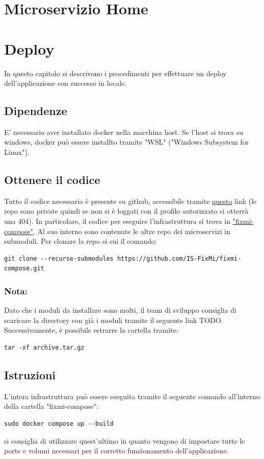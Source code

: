 \documentclass{report}
\begin{document}
\chapter{Microservizio Home}

\chapter{Deploy}

In questo capitolo si descrivono i procedimenti per effettuare un deploy dell'applicazione con successo in locale.

\section{Dipendenze}
E' necessario aver installato docker nella macchina host. Se l'host si trova su windows, docker può essere installto tramite "WSL" ("Windows Subsystem for Linux").


\section{Ottenere il codice}
Tutto il codice necessario è presente su github, accessibile tramite \href{https://github.com/orgs/IS-FixMi/repositories}{questo} link (le repo sono private quindi se non si è loggati con il profilo autorizzato si otterrà una 404). In particolare, il codice per eseguire l'infrastruttura si trova in \href{https://github.com/IS-FixMi/fixmi-compose}{"fixmi-compose"}. Al suo interno sono contenute le altre repo dei microservizi in submoduli. Per clonare la repo si sui il comando:
\begin{verbatim}
git clone --recurse-submodules https://github.com/IS-FixMi/fixmi-compose.git
\end{verbatim}
\subsection*{Nota:}
Dato che i moduli da installare sono molti, il team di sviluppo consiglia di scaricare la directory con già i moduli tramite il seguente link TODO.
Successivamente, è possibile estrarre la cartella tramite:
\begin{verbatim}
tar -xf archive.tar.gz
\end{verbatim}

\section{Istruzioni}
L'intera infrastruttura può essere eseguita tramite il seguente comando all'interno della cartella "fixmi-compose":
\begin{verbatim}
sudo docker compose up --build
\end{verbatim}
si consiglia di utilizzare quest'ultimo in quanto vengono di impostare tutte le porte e volumi necessari per il corretto funzionamento dell'applicazione.
\end{document}
